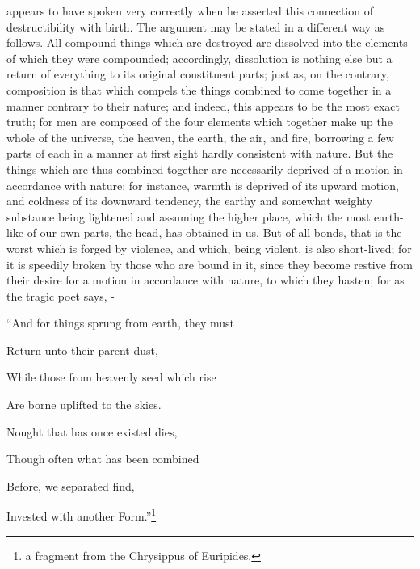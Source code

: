 appears to have spoken very correctly when he asserted this connection of destructibility with
birth. The argument may be stated in a different way as follows. All compound things which are
destroyed are dissolved into the elements of which they were compounded; accordingly,
dissolution is nothing else but a return of everything to its original constituent parts; just as, on the
contrary, composition is that which compels the things combined to come together in a manner
contrary to their nature; and indeed, this appears to be the most exact truth; for men are
composed of the four elements which together make up the whole of the universe, the heaven, the
earth, the air, and fire, borrowing a few parts of each in a manner at first sight hardly consistent
with nature. But the things which are thus combined together are necessarily deprived of a motion
in accordance with nature; for instance, warmth is deprived of its upward motion, and coldness of
its downward tendency, the earthy and somewhat weighty substance being lightened and assuming
the higher place, which the most earth-like of our own parts, the head, has obtained in us. But of all
bonds, that is the worst which is forged by violence, and which, being violent, is also short-lived; for
it is speedily broken by those who are bound in it, since they become restive from their desire for a
motion in accordance with nature, to which they hasten; for as the tragic poet says, -

``And for things sprung from earth, they must

Return unto their parent dust,

While those from heavenly seed which rise

Are borne uplifted to the skies.

Nought that has once existed dies,

Though often what has been combined

Before, we separated find,

Invested with another Form.''\footnote{a fragment from the Chrysippus of Euripides.}

